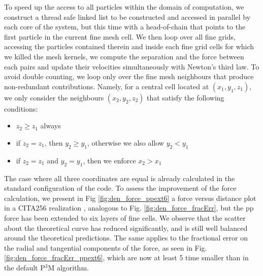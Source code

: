  To speed up the access to all particles within the domain of computation, we construct a thread safe linked list
 to be constructed and accessed in parallel by each core of the system, but this time with a head-of-chain that points to the first particle in the current fine mesh cell. We then loop over all fine grids, accessing the particles contained therein and inside each fine grid cells for which we killed the mesh kernels,
 we compute the separation and the force between each pairs and update their velocities simultaneously with Newton's third law. 
 To avoid double counting, we loop only over the fine mesh neighbours that produce non-redundant contributions. Namely, for a central cell located at 
 $(x_1, y_1, z_1)$, we only consider the neighbours $(x_2, y_2, z_2)$ that satisfy the following conditions:
 \begin{itemize}
 \item{$z_2 \ge z_1$ always}
 \item{if $z_2 = z_1$, then $y_2 \ge y_1$, otherwise we also allow $y_2 < y_1$} 
 \item{if $z_2 = z_1$ and $y_2 = y_1$, then we enforce $x_2 > x_1$}
 \end{itemize}
 The case where all three coordinates are equal is already calculated in the standard configuration of the code.
 To assess the improvement of the force calculation, we present in Fig \ref{fig:den_force_ppext6} a force versus distance
 plot in a CITA256 realization , analogous to Fig. \ref{fig:den_force_fracErr}, but the pp force has been extended to six layers of fine cells. 
 We observe that the scatter about the theoretical curve has reduced significantly, and is still well balanced around the theoretical predictions.
 The same applies to the fractional error on the radial and tangential components of the force, as seen in Fig. \ref{fig:den_force_fracErr_ppext6},
 which are now at least 5 time smaller than in the default P$^{3}$M algorithm.
 
